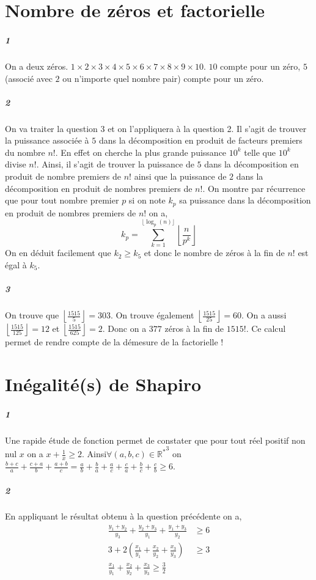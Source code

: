 \documentclass[10pt,a4paper]{article}
\begin{document}
\section{Nombre de zéros et factorielle}
\subparagraph{1}On a deux zéros. $1 \times 2 \times 3 \times 4 \times 5 \times 6 \times 7 \times 8 \times 9 \times 10$. $10$ compte pour un zéro, $5$ (associé avec $2$ ou n'importe quel nombre pair) compte pour un zéro.
\subparagraph{2} On va traiter la question 3 et on l'appliquera à la question 2. Il s'agit de trouver la puissance associée à $5$ dans la décomposition en produit de facteurs premiers du nombre $n!$. En effet on cherche la plus grande puissance $10^k$ telle que $10^k$ divise $n!$. Ainsi, il s'agit de trouver la puissance de $5$ dans la décomposition en produit de nombre premiers de $n!$ ainsi que la puissance de $2$ dans la décomposition en produit de nombres premiers de $n!$. On montre par récurrence que pour tout nombre premier $p$ si on note $k_p$ sa puissance dans la décomposition en produit de nombres premiers de $n!$ on a,
\begin{equation}
k_p = \underset{k=1}{\overset{\lfloor \log_p(n) \rfloor}{\sum}} \left\lfloor \frac{n}{p^k}\right\rfloor
\end{equation}
On en déduit facilement que $k_2 \ge k_5$ et donc le nombre de zéros à la fin de $n!$ est égal à $k_5$. 
\subparagraph{3}On trouve que $\left\lfloor \frac{1515}{5} \right\rfloor = 303$. On trouve également $\left\lfloor \frac{1515}{25} \right\rfloor = 60$. On a aussi $\left\lfloor \frac{1515}{125} \right\rfloor = 12$ et $\left\lfloor \frac{1515}{625} \right\rfloor = 2$. Donc on a $377$ zéros à la fin de $1515!$. Ce calcul permet de rendre compte de la démesure de la factorielle !
\section{Inégalité(s) de Shapiro}

\subparagraph{1}Une rapide étude de fonction permet de constater que pour tout réel positif non nul $x$ on a $x+\frac{1}{x} \ge 2$. Ainsi$\forall (a,b,c) \in {\mathbb{R}^*}^3$ on  $\frac{b+c}{a}+\frac{c+a}{b}+\frac{a+b}{c} = \frac{a}{b} + \frac{b}{a} + \frac{a}{c} + \frac{c}{a} + \frac{b}{c} + \frac{c}{b} \ge 6$.

\subparagraph{2} En appliquant le résultat obtenu à la question précédente on a,
\begin{equation}
\begin{aligned}
\frac{y_1+y_2}{y_3} + \frac{y_2+y_3}{y_1} + \frac{y_1+y_3}{y_2} &\ge 6 \\
3 + 2 \left( \frac{x_1}{y_1} + \frac{x_2}{y_2} + \frac{x_3}{y_3} \right) &\ge 3 \\
\frac{x_1}{y_1} + \frac{x_2}{y_2} + \frac{x_3}{y_3} \ge \frac{3}{2}
\end{aligned}
\end{equation}
\end{document}

